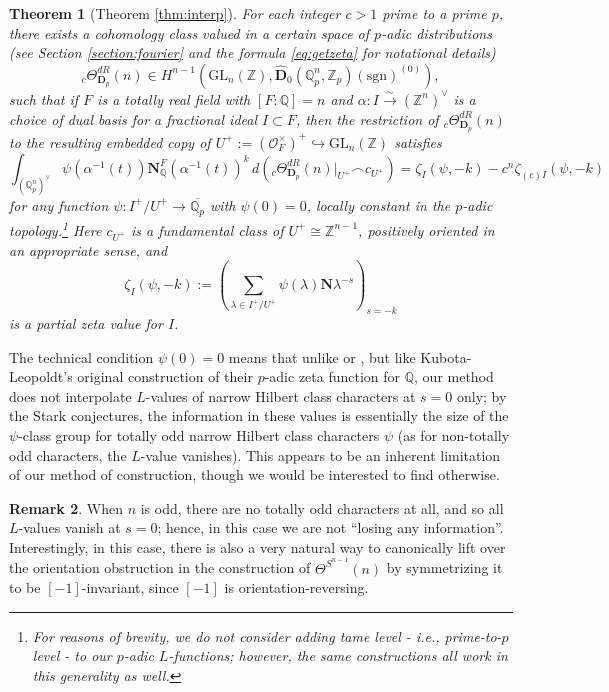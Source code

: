\documentclass[10pt]{amsart}
\newtheorem{thm}{Theorem}[section]
\theoremstyle{definition}
\newtheorem{rem}[thm]{Remark}
\newcommand{\Z}{\mathbb{Z}}
\newcommand{\Q}{\mathbb{Q}}
\newcommand{\D}{\mathbf{D}}
\newcommand{\sgn}{\mathrm{sgn}}
\newcommand{\GL}{\mathrm{GL}}
\numberwithin{equation}{section}
\begin{document}
    \begin{thm}[Theorem \ref{thm:interp}] \label{thm:distros}
        For each integer $c>1$ prime to a prime $p$, there exists a cohomology class valued in a certain space of $p$-adic distributions (see Section \ref{section:fourier} and the formula \eqref{eq:getzeta} for notational details)
        \[
        {}_c\Theta^{dR}_{\D_p}(n)\in H^{n-1}(\GL_n(\Z),\hat{\D}_0(\Q_p^n, \Z_p)(\sgn)^{(0)}),
        \]
        such that if $F$ is a totally real field with $[F:\Q]=n$ and $\alpha:I\xrightarrow{\sim} (\Z^n)^\vee$ is a choice of dual basis for a fractional ideal $I\subset F$, then the restriction of
        ${}_c\Theta^{dR}_{\D_p}(n)$ to the resulting embedded copy of $U^+:=(\mathcal{O}_F^\times)^+\hookrightarrow \GL_n(\Z)$ satisfies
        \[
            \int_{(\Q_p^n)^\vee} \psi(\alpha^{-1}(t))\mathbf{N}^F_\Q(\alpha^{-1}(t))^k\, d({}_c\Theta^{dR}_{\D_p}(n)|_{U^+} \frown c_{U^+}) = \zeta_{I}(\psi, -k)-c^{n}\zeta_{(c)I}(\psi, -k) 
        \]
        for any function $\psi:I^+/U^+\to \overline{\Q_p}$ with $\psi(0)=0$, locally constant in the $p$-adic topology.\footnote{For reasons of brevity, we do not consider adding tame level - i.e., prime-to-$p$ level - to our $p$-adic $L$-functions; however, the same constructions all work in this generality as well.} Here $c_{U^+}$ is a fundamental class of $U^+\cong \Z^{n-1}$, positively oriented in an appropriate sense, and 
        \[
        \zeta_{I}(\psi, -k) := \left(\sum_{\lambda \in I^+/U^+} \psi(\lambda)\mathbf{N}\lambda^{-s}\right)_{s=-k}
        \]
        is a partial zeta value for $I$.
    \end{thm}
    The technical condition $\psi(0)=0$ means that unlike \cite{DR} or \cite{CN}, but like Kubota-Leopoldt's original construction of their $p$-adic zeta function for $\Q$, our method does not interpolate $L$-values of narrow Hilbert class characters at $s=0$ only; by the Stark conjectures, the information in these values is essentially the size of the $\psi$-class group for totally odd narrow Hilbert class characters $\psi$ (as for non-totally odd characters, the $L$-value vanishes). This appears to be an inherent limitation of our method of construction, though we would be interested to find otherwise. 
    
    \begin{rem}\label{rem:totallyodd}
        When $n$ is odd, there are no totally odd characters at all, and so all $L$-values vanish at $s=0$; hence, in this case we are not ``losing any information''. Interestingly, in this case, there is also a very natural way to canonically lift over the orientation obstruction in the construction of $\Theta^{S^{n-1}}(n)$ by symmetrizing it to be $[-1]$-invariant, since $[-1]$ is orientation-reversing. 
    \end{rem}
\end{document}
